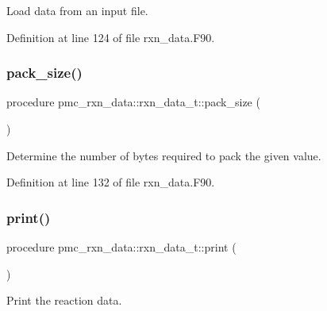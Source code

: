 Load data from an input file. 



Definition at line 124 of file rxn\+\_\+data.\+F90.

\mbox{\label{structpmc__rxn__data_1_1rxn__data__t_ac2a32772ed2e5853726fe0d500b86f5d}} 
\subsubsection{\texorpdfstring{pack\+\_\+size()}{pack\_size()}}
{\footnotesize\ttfamily procedure pmc\+\_\+rxn\+\_\+data\+::rxn\+\_\+data\+\_\+t\+::pack\+\_\+size (\begin{DoxyParamCaption}{ }\end{DoxyParamCaption})\hspace{0.3cm}{\ttfamily [private]}}



Determine the number of bytes required to pack the given value. 



Definition at line 132 of file rxn\+\_\+data.\+F90.

\mbox{\label{structpmc__rxn__data_1_1rxn__data__t_a6ad6dfa9cc1f6c3ccd60f9fe3f971ca3}} 
\subsubsection{\texorpdfstring{print()}{print()}}
{\footnotesize\ttfamily procedure pmc\+\_\+rxn\+\_\+data\+::rxn\+\_\+data\+\_\+t\+::print (\begin{DoxyParamCaption}{ }\end{DoxyParamCaption})\hspace{0.3cm}{\ttfamily [private]}}



Print the reaction data. 



